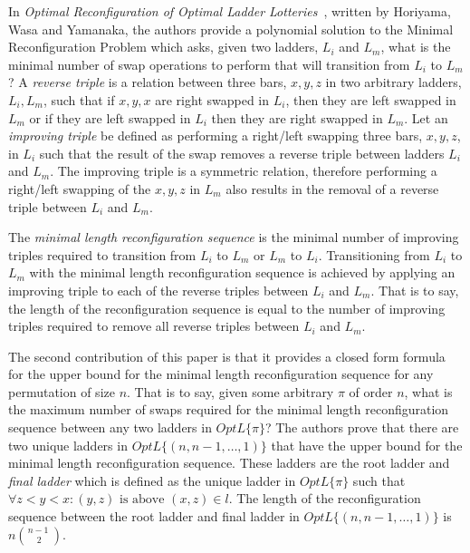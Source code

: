 In \emph{Optimal Reconfiguration of Optimal Ladder Lotteries}~\cite{A2}, written by Horiyama, Wasa and Yamanaka,
the authors provide a polynomial solution to the 
Minimal Reconfiguration Problem which asks, given 
two ladders, $L_{i}$ and  $L_{m}$, what is the minimal number of 
swap operations to perform that will transition from $L_{i}$ to $L_{m}$? A \emph{reverse triple} 
is a relation between three bars, $x,y,z$ in two arbitrary ladders, $L_{i}, L_{m}$, such that if $x,y,x$
are right swapped in $L_{i}$, then they are left swapped in $L_{m}$ or if they are 
left swapped in $L_{i}$ then they are right swapped in $L_{m}$. 
Let an \emph{improving triple} be defined as  
performing a right/left swapping three bars, $x,y,z$, in $L_{i}$ such that the 
result of the swap removes a reverse triple between
ladders $L_{i}$ and $L_{m}$. The improving triple is a symmetric 
relation, therefore performing a right/left swapping of the $x,y,z$ in $L_{m}$ also results in the 
removal of a reverse triple between $L_{i}$ and $L_{m}$.\par
The \emph{minimal length reconfiguration sequence} is the minimal number of 
improving triples required to transition from $L_{i}$ to $L_{m}$ or 
$L_{m}$ to $L_{i}$. Transitioning from $L_{i}$ to $L_{m}$ with the minimal length reconfiguration sequence 
is achieved by applying an improving triple to each of the reverse triples between 
$L_{i}$ and $L_{m}$. That is to say, the length of the reconfiguration sequence 
is equal to the number of improving triples required to remove all reverse triples between $L_{i}$ and  $L_{m}$.\par
The second contribution of this paper is that it provides a closed form formula for the 
upper bound for the minimal length reconfiguration sequence for any permutation 
of size $n$. That is to say, given some arbitrary $\pi$ of order $n$, what is the maximum 
number of swaps required for the minimal length reconfiguration sequence between any two ladders in $OptL\{\pi\}$?
The authors prove that there are two unique ladders in $OptL\{(n, n-1, \dots, 1)\}$ that 
have the upper bound for the minimal length reconfiguration sequence. These ladders are the root ladder and \emph{final ladder} 
which is defined as the unique ladder in $OptL\{\pi\}$ such that $\forall z < y < x: (y,z) \text{ is above } (x,z) \in l$. 
The length of the reconfiguration sequence 
between the root ladder and final ladder in $OptL\{(n, n-1, \dots, 1)\}$ is $n{n-1~\choose 2}$. 
